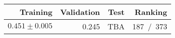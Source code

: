 \begin{tabular}{r|r|r|r}
Training & Validation & Test & Ranking \\\hline
$0.451 \pm 0.005$ & 0.245 & TBA & 187~/~373 \\\hline
\end{tabular}
